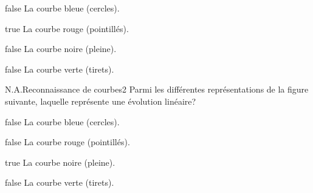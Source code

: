         \begin{reponses}
            \item[false] La courbe bleue (cercles).
		    \item[true] La courbe rouge (pointillés).
		    \item[false] La courbe noire (pleine).
		    \item[false] La courbe verte (tirets).
		    \end{reponses}
		\begin{question}{N.A.}{Reconnaissance de courbes}{2}{}
            Parmi les différentes représentations de la figure suivante, laquelle représente une évolution linéaire?
            \begin{figure}
             \end{figure}
        \end{question}
        \begin{reponses}
            \item[false] La courbe bleue (cercles).
		    \item[false] La courbe rouge (pointillés).
		    \item[true] La courbe noire (pleine).
		    \item[false] La courbe verte (tirets).
		    \end{reponses}
